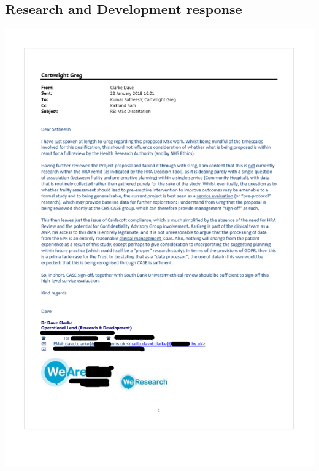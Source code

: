 \documentclass
[
	12pt,
	a4paper,
	oneside,
]{article}
\begin{document}
\begin{appendix}
\section{Research and Development response}
\label{appendix:daveclarke}
\includegraphics[width=\textwidth]{daveclarke}

\end{appendix}
\end{document}
